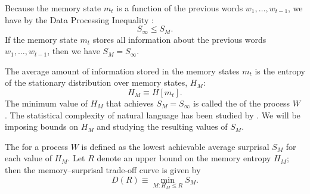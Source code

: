  
 
Because the memory state $m_t$ is a function of the previous words $w_1, \dots, w_{t-1}$, we have by the Data Processing Inequality \citep[][pp. 34--35]{cover2006elements}:
\begin{equation}
    S_\infty \le S_M.
\end{equation}
If the memory state $m_t$ stores all information about the previous words $w_1, \dots, w_{t-1}$, then we have $S_M = S_\infty$.



The average amount of information stored in the memory states $m_t$ is the entropy of the stationary distribution over memory states, $H_M$:
\begin{equation}
    \label{eq:memory-entropy}
    H_M \equiv H[m_t].
\end{equation}
The minimum value of $H_M$ that achieves $S_M = S_\infty$ is called the  of the process $W$ \citep{feldman-measures-1998}. The statistical complexity of natural language has been studied by \citet{hahn2019neural}. We will be imposing bounds on $H_M$ and studying the resulting values of $S_M$. 

\begin{definition}
The  for a process $W$ is defined as the lowest achievable average surprisal $S_M$ for each value of $H_M$. Let $R$ denote an upper bound on the memory entropy $H_M$; then the memory--surprisal trade-off curve is given by
\begin{equation}
    \label{eq:ms-formal}
    D(R) \equiv \min_{M : H_M \le R} S_M.
\end{equation}
\end{definition}

